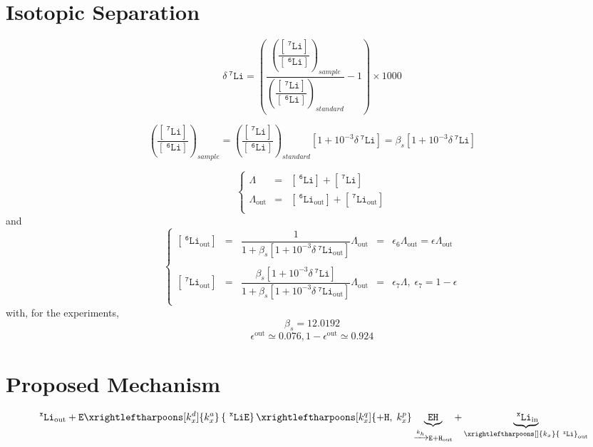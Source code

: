 \documentclass[aps,onecolumn,12pt]{revtex4}
\newcommand{\mychem}[1]{\mathtt{#1}}
\newcommand{\myconc}[1]{\left\lbrack{#1}\right\rbrack}
\newcommand{\spLi}[1]{{~^{\mychem{#1}}\mychem{Li}}}
\newcommand{\Li}[1]{\myconc{\spLi{#1}}}
\newcommand{\spEout}{\mychem{E}}
\newcommand{\spLiE}[1]{\left\lbrace\spLi{#1}\spEout\right\rbrace}
\newcommand{\spLiIn}[1]{{\spLi{#1}}_{\mathrm{in}}}
\newcommand{\spLiOut}[1]{{\spLi{#1}}_{\mathrm{out}}}
\newcommand{\LiOut}[1]{\myconc{\spLiOut{#1}}}
\newcommand{\spEHin}{\mychem{EH}}
\newcommand{\deltaLi}{ {\delta\!\!\!\spLi{7}} }
\newcommand{\deltaLiOut}{{\deltaLi}_{\mathrm{out}}}
\newcommand{\LiAll}{\Lambda}
\newcommand{\LiAllOut}{{\LiAll}_{\mathrm{out}}}
\begin{document}
\section{Isotopic Separation}
$$
	\deltaLi = \left(
		\dfrac{\left(\dfrac{\Li{7}}{\Li{6}}\right)_{sample}}
		{\left(\dfrac{\Li{7}}{\Li{6}}\right)_{standard}}
		 -1 
	\right) \times 1000
$$

$$
	\left(\dfrac{\Li{7}}{\Li{6}}\right)_{sample} = \left(\dfrac{\Li{7}}{\Li{6}}\right)_{standard} \left[1+10^{-3}\deltaLi\right] = \beta_s \left[1+10^{-3}\deltaLi\right]
$$

\begin{equation}
\left\lbrace
\begin{array}{rcl}
	\LiAll    & = & \Li{6} + \Li{7}\\
	\LiAllOut & = & \LiOut{6} + \LiOut{7}\\
\end{array}
\right.
\end{equation}
and
\begin{equation}
\left\lbrace
\begin{array}{rclcl}
	\LiOut{6} & = & \dfrac{1}{1+\beta_s \left[1+10^{-3}\deltaLiOut\right] } \LiAllOut & = & \epsilon_6 \LiAllOut  = \epsilon \LiAllOut \\
	\\
	\LiOut{7} & = & \dfrac{\beta_s \left[1+10^{-3}\deltaLi\right]}{1+\beta_s \left[1+10^{-3}\deltaLiOut\right] } \LiAllOut & = & \epsilon_7 \LiAll,\;\epsilon_7 = 1-\epsilon \\
\end{array}
\right.
\end{equation}
with, for the experiments,
\begin{equation}
	\beta_s = 12.0192
\end{equation}
\begin{equation}
	\epsilon^\mathrm{out} \simeq 0.076, 1-\epsilon^\mathrm{out} \simeq 0.924
\end{equation}

\section{Proposed Mechanism}

\begin{equation}
	 \spLiOut{x} +  \spEout  
	 \xrightleftharpoons[k_x^d]{k_x^a} 
	 \spLiE{x}
	  \xrightleftharpoons[k_x^q]{\mychem{+H},\;k_x^p} \underbrace{\spEHin}_{\xrightarrow[]{k_h} \mychem{E} + \mychem{H}_{\mathrm{out}}} + \underbrace{\spLiIn{x}}_{\xrightleftharpoons[]{k_x} \spLiOut{x}}
\end{equation}
\end{document}
